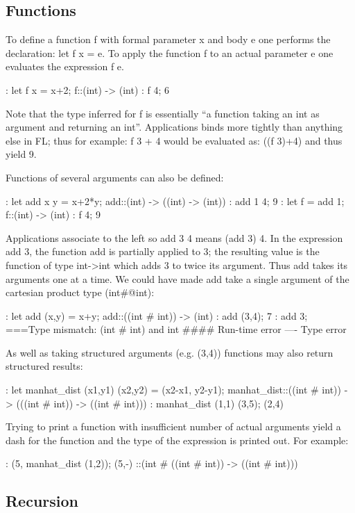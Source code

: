 \subsection{Functions}

To define a function f with formal parameter x and body e one performs
the declaration:
let f x = e. To apply the function f to an actual parameter e one evaluates
the expression f e.
\begin{hol}
: let f x = x+2;
f::(int) -> (int)
: f 4;
6
\end{hol}
Note that the type inferred for f is essentially ``a function taking
an int as argument and
returning an int''. Applications binds more tightly than anything else
in FL; thus for example:
f 3 + 4 would be evaluated as: ((f 3)+4) and thus yield 9.

Functions of several arguments can also be defined:
\begin{hol}
: let add x y = x+2*y;
add::(int) -> ((int) -> (int))
: add 1 4;
9
: let f = add 1;
f::(int) -> (int)
: f 4;
9
\end{hol}
Applications associate to the left so add 3 4 means (add 3) 4. In the
expression add 3, the
function add is partially applied to 3; the resulting value is the
function of type int->int which
adds 3 to twice its argument. Thus add takes its arguments one at a
time. We could have made
add take a single argument of the cartesian product type (int\verb@#@int):
\begin{hol}
: let add (x,y) = x+y;
add::((int # int)) -> (int)
: add (3,4);
7
: add 3;
===Type mismatch: (int # int) and int
#### Run-time error
---- Type error
\end{hol}
As well as taking structured arguments (e.g. (3,4)) functions may also return
structured results:
\begin{hol}
: let manhat_dist (x1,y1) (x2,y2) = (x2-x1, y2-y1);
manhat_dist::((int # int)) -> (((int # int)) -> ((int # int)))
: manhat_dist (1,1) (3,5);
(2,4)
\end{hol}

Trying to print a function with insufficient number of actual arguments
yield a dash
for the function and the type of the expression is printed out. For example:
\begin{hol}
: (5, manhat_dist (1,2));
(5,-) ::(int # ((int # int)) -> ((int # int)))
\end{hol}

\subsection{Recursion}

